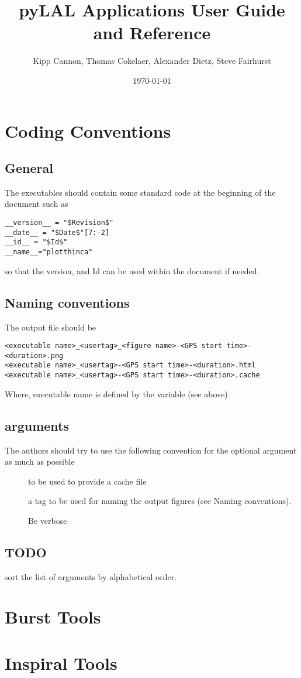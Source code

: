 \documentclass{book}
\title{pyLAL Applications User Guide and Reference}
\author{Kipp Cannon, Thomas Cokelaer, Alexander Dietz, Steve Fairhurst}
\date{\today}
\begin{document}
\maketitle
\tableofcontents
\listoftables
\listoffigures
\chapter{Coding Conventions}
\section{General}
The executables should contain some standard code at the beginning of the document such
as
\begin{verbatim}
__version__ = "$Revision$"
__date__ = "$Date$"[7:-2]
__id__ = "$Id$"
__name__="plotthinca"
\end{verbatim}
so that the version, and Id can be used within the document if needed.

\section{Naming conventions}
The output file should be 
\begin{verbatim}
<executable name>_<usertag>_<figure name>-<GPS start time>-<duration>.png
<executable name>_<usertag>-<GPS start time>-<duration>.html
<executable name>_<usertag>-<GPS start time>-<duration>.cache
\end{verbatim}
Where, executable name is defined by the variable  (see above)


\section{arguments}
The authors should try to use the following convention for the optional
argument as much as possible
\begin{description}
\item[] to be used to provide a cache file
\item[] a tag to be used for naming the output figures
(see Naming conventions).
\item[] Be verbose
\end{description}

\section{TODO}
sort the list of arguments by alphabetical order.



\chapter{Burst Tools}

\chapter{Inspiral Tools}

\end{document}
